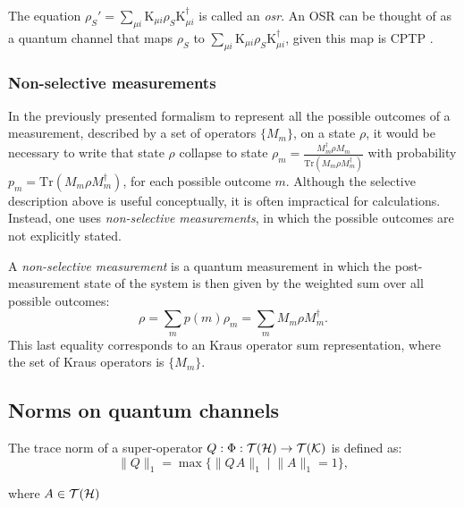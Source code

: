 \begin{definition}
  The equation $ \rho_{S}' = \sum_{\mu i} \text{K}_{\mu i} \rho_{S} \text{K}_{\mu i}^{\dag} $ is called an \emph{\acrfull{osr}}. An OSR can be thought of as a quantum channel that maps $\rho_{S}$ to $\sum_{\mu i} \text{K}_{\mu i} \rho_{S} \text{K}_{\mu i}^{\dag}$, given this map is CPTP \cite{lidar2019lecture, watrous2018theory}. 
\end{definition}




\subsubsection{Non-selective measurements}

In the previously presented formalism to represent all the possible outcomes of a measurement, described by a set of operators $\{M_{m}\}$, on a state $\rho$, it would be necessary to write that state $\rho$ collapse to state $\rho_m=\frac{M_{m}^{\dag}\rho M_{m}}{\text{Tr}(M_{m}\rho M_{m}^{\dag})}$ with probability $p_m=\text{Tr}(M_{m}\rho M_{m}^{\dag})$, for each possible outcome $m$. Although the selective description above is useful conceptually, it is often impractical for calculations. Instead, one uses \emph{non-selective measurements}, in which the possible outcomes are not explicitly stated.


\begin{definition}
A \emph{non-selective measurement} is a quantum measurement in which the post-measurement state of the system is then given by the weighted sum over all possible outcomes:
\[
\rho = \sum_m p(m) \rho_m = \sum_m M_m \rho M_m^{\dag}.
\]
This last equality corresponds to an Kraus operator sum representation, where the set of Kraus operators is $\{M_{m}\}$.
\end{definition}

\subsection{Norms on quantum channels}
\begin{definition} \label{def:trace_norm_superoperator}
  The trace norm of a super-operator $Q:\Phi: \mathcal{T}(\mathcal{H}) \rightarrow \mathcal{T}(\mathcal{K})$ is defined as:
  \begin{equation*} 
    \lVert Q \rVert_{1} =  \max\{\lVert Q \hspace{1pt} A \rVert_{1}   \mid  \lVert A \rVert_{1}=1\}, 
  \end{equation*}
\end{definition}
where $A \in \mathcal{T}(\mathcal{H})$

